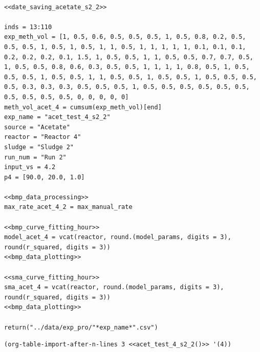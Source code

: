 \documentclass[11pt]{article}
\begin{document}
\begin{verbatim}

<<date_saving_acetate_s2_2>>

inds = 13:110
exp_meth_vol = [1, 0.5, 0.6, 0.5, 0.5, 0.5, 1, 0.5, 0.8, 0.2, 0.5, 0.5, 0.5, 1, 0.5, 1, 0.5, 1, 1, 0.5, 1, 1, 1, 1, 1, 0.1, 0.1, 0.1, 0.2, 0.2, 0.2, 0.1, 1.5, 1, 0.5, 0.5, 1, 1, 0.5, 0.5, 0.7, 0.7, 0.5, 1, 0.5, 0.5, 0.8, 0.6, 0.3, 0.5, 0.5, 1, 1, 1, 1, 0.8, 0.5, 1, 0.5, 0.5, 0.5, 1, 0.5, 0.5, 1, 1, 0.5, 0.5, 1, 0.5, 0.5, 1, 0.5, 0.5, 0.5, 0.5, 0.3, 0.3, 0.3, 0.5, 0.5, 0.5, 1, 0.5, 0.5, 0.5, 0.5, 0.5, 0.5, 0.5, 0.5, 0.5, 0.5, 0, 0, 0, 0, 0]
meth_vol_acet_4 = cumsum(exp_meth_vol)[end]
exp_name = "acet_test_4_s2_2"
source = "Acetate"
reactor = "Reactor 4"
sludge = "Sludge 2"
run_num = "Run 2"
input_vs = 4.2
p4 = [90.0, 20.0, 1.0]

<<bmp_data_processing>>
max_rate_acet_4_2 = max_manual_rate

<<bmp_curve_fitting_hour>>
model_acet_4 = vcat(reactor, round.(model_params, digits = 3), round(r_squared, digits = 3))
<<bmp_data_plotting>>

<<sma_curve_fitting_hour>>
sma_acet_4 = vcat(reactor, round.(model_params, digits = 3), round(r_squared, digits = 3))  
<<bmp_data_plotting>>

return("../data/exp_pro/"*exp_name*".csv")

\end{verbatim}

\begin{verbatim}
(org-table-import-after-n-lines 3 <<acet_test_4_s2_2()>> '(4))
\end{verbatim}
\end{document}
